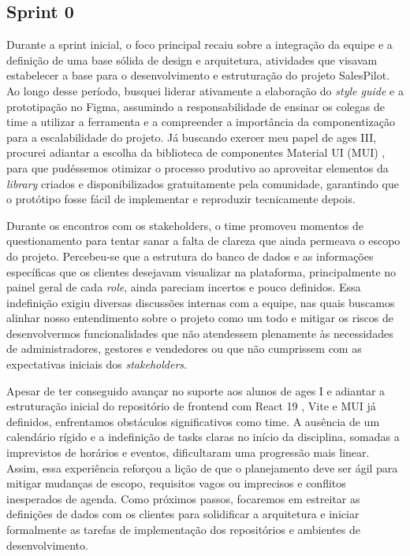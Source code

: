 \subsection{Sprint 0}

Durante a sprint inicial, o foco principal recaiu sobre a integração da equipe e a definição de uma base sólida de design e arquitetura, atividades que visavam estabelecer a base para o desenvolvimento e estruturação do projeto SalesPilot. Ao longo desse período, busquei liderar ativamente a elaboração do \textit{style guide} e a prototipação no Figma, assumindo a responsabilidade de ensinar os colegas de time a utilizar a ferramenta e a compreender a importância da componentização para a escalabilidade do projeto. Já buscando exercer meu papel de \ac{ages} III, procurei adiantar a escolha da biblioteca de componentes Material UI (MUI) \cite{MUI}, para que pudéssemos otimizar o processo produtivo ao aproveitar elementos da \textit{library} criados e disponibilizados gratuitamente pela comunidade, garantindo que o protótipo fosse fácil de implementar e reproduzir tecnicamente depois.

Durante os encontros com os stakeholders, o time promoveu momentos de questionamento para tentar sanar a falta de clareza que ainda permeava o escopo do projeto. Percebeu-se que a estrutura do banco de dados e as informações específicas que os clientes desejavam visualizar na plataforma, principalmente no painel geral de cada \textit{role}, ainda pareciam incertos e pouco definidos. Essa indefinição exigiu diversas discussões internas com a equipe, nas quais buscamos alinhar nosso entendimento sobre o projeto como um todo e mitigar os riscos de desenvolvermos funcionalidades que não atendessem plenamente às necessidades de administradores, gestores e vendedores ou que não cumprissem com as expectativas iniciais dos \textit{stakeholders}.

Apesar de ter conseguido avançar no suporte aos alunos de \ac{ages} I e adiantar a estruturação inicial do repositório de frontend com React 19 \cite{React}, Vite \cite{Vite} e MUI \cite{MUI} já definidos, enfrentamos obstáculos significativos como time. A ausência de um calendário rígido e a indefinição de tasks claras no início da disciplina, somadas a imprevistos de horários e eventos, dificultaram uma progressão mais linear. Assim, essa experiência reforçou a lição de que o planejamento deve ser ágil para mitigar mudanças de escopo, requisitos vagos ou imprecisos e conflitos inesperados de agenda. Como próximos passos, focaremos em estreitar as definições de dados com os clientes para solidificar a arquitetura e iniciar formalmente as tarefas de implementação dos repositórios e ambientes de desenvolvimento.